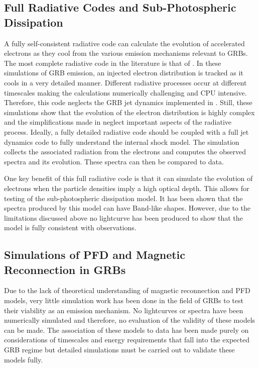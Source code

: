 \subsection{Full Radiative Codes and Sub-Photospheric Dissipation}
A fully self-consistent radiative code can calculate the evolution of
accelerated electrons as they cool from the various emission
mechanisms relevant to GRBs. The most complete radiative code in the
literature is that of \cite{Peer:2005}. In these simulations of GRB
emission, an injected electron distribution is tracked as it cools in
a very detailed manner. Different radiative processes occur at
different timescales making the calculations numerically challenging
and CPU intensive. Therefore, this code neglects the GRB jet dynamics
implemented in \cite{Daigne:2009}. Still, these simulations show that
the evolution of the electron distribution is highly complex and the
simplifications made in \cite{Daigne:1998,Daigne:2009} neglect
important aspects of the radiative process. Ideally, a fully detailed
radiative code should be coupled with a full jet dynamics code to
fully understand the internal shock model. The simulation collects the
associated radiation from the electrons and computes the observed
spectra and its evolution. These spectra can then be compared to data.

One key benefit of this full radiative code is that it can simulate
the evolution of electrons when the particle densities imply a high optical
depth. This allows for testing of the sub-photospheric dissipation
model. It has been shown that the spectra produced by this model can
have Band-like shapes. However, due to the limitations discussed above
no lightcurve has been produced to show that the model is fully
consistent with observations.

\subsection{Simulations of PFD and Magnetic Reconnection in GRBs}
Due to the lack of theoretical understanding of magnetic reconnection
and PFD models, very little simulation work has been done in the field
of GRBs to test their viability as an emission mechanism. No lightcurves or spectra have been numerically simulated and
therefore, no evaluation of the validity of these models can be
made. The association of these models to data has been made purely on
considerations of timescales and energy requirements that fall into
the expected GRB regime but detailed simulations must be carried out
to validate these models fully.




